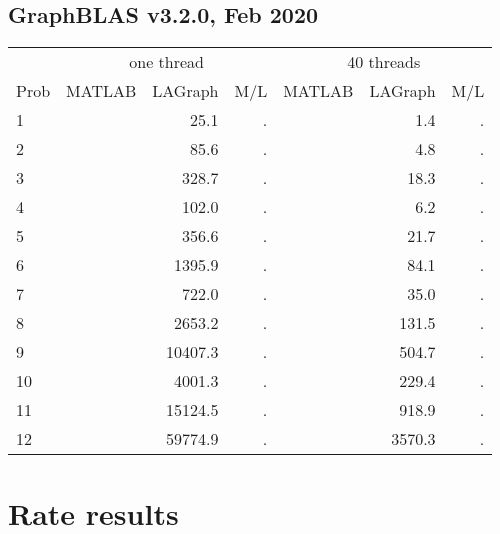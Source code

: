 \documentclass[12pt]{article}
\begin{document}
\subsection{GraphBLAS v3.2.0, Feb 2020}

{\small
\begin{tabular}{l|rr|r||rr|r}
\hline
     & \multicolumn{3}{c}{one thread}                &  \multicolumn{3}{c}{40 threads}  \\
Prob & MATLAB         & LAGraph        & M/L         &   MATLAB      & LAGraph       & M/L        \\
\hline
  1  &                &          25.1  &      .      &               &          1.4  &      .     \\
  2  &                &          85.6  &      .      &               &          4.8  &      .     \\
  3  &                &         328.7  &      .      &               &         18.3  &      .     \\
\hline
  4  &                &         102.0  &      .      &               &          6.2  &      .     \\
  5  &                &         356.6  &      .      &               &         21.7  &      .     \\
  6  &                &        1395.9  &      .      &               &         84.1  &      .     \\
\hline
  7  &                &         722.0  &      .      &               &         35.0  &      .     \\
  8  &                &        2653.2  &      .      &               &        131.5  &      .     \\
  9  &                &       10407.3  &      .      &               &        504.7  &      .     \\
\hline
 10  &                &        4001.3  &      .      &               &        229.4  &      .     \\
 11  &                &       15124.5  &      .      &               &        918.9  &      .     \\
 12  &                &       59774.9  &      .      &               &       3570.3  &      .     \\
\end{tabular}
}

\newpage
\section{Rate results}
\end{document}
